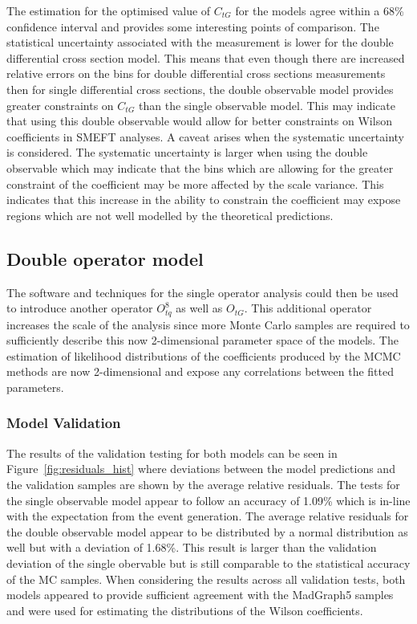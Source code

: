 \documentclass[a4paper,11pt]{article}
\begin{document}
The estimation for the optimised value of $C_{tG}$ for the models agree within a 68\% confidence interval and provides some interesting points of comparison.
The statistical uncertainty associated with the measurement is lower for the double differential cross section model.
This means that even though there are increased relative errors on the bins for double differential cross sections measurements then for single differential cross sections, the double observable model provides greater constraints on $C_{tG}$ than the single observable model.
This may indicate that using this double observable would allow for better constraints on Wilson coefficients in SMEFT analyses.
A caveat arises when the systematic uncertainty is considered.
The systematic uncertainty is larger when using the double observable which may indicate that the bins which are allowing for the greater constraint of the coefficient may be more affected by the scale variance.
This indicates that this increase in the ability to constrain the coefficient may expose regions which are not well modelled by the theoretical predictions.


\subsection{Double operator model}

The software and techniques for the single operator analysis could then be used to introduce another operator $O_{tq}^{8}$ as well as $O_{tG}$.
This additional operator increases the scale of the analysis since more Monte Carlo samples are required to sufficiently describe this now 2-dimensional parameter space of the models.
The estimation of likelihood distributions of the coefficients produced by the MCMC methods are now 2-dimensional and expose any correlations between the fitted parameters.

\subsubsection{Model Validation}

The results of the validation testing for both models can be seen in Figure~\ref{fig:residuals_hist} where deviations between the model predictions and the validation samples are shown by the average relative residuals.
The tests for the single observable model appear to follow an accuracy of 1.09\% which is in-line with the expectation from the event generation.
The average relative residuals for the double observable model appear to be distributed by a normal distribution as well but with a deviation of 1.68\%.
This result is larger than the validation deviation of the single obervable but is still comparable to the statistical accuracy of the MC samples.
When considering the results across all validation tests, both models appeared to provide sufficient agreement with the MadGraph5 samples and were used for estimating the distributions of the Wilson coefficients.
\end{document}
